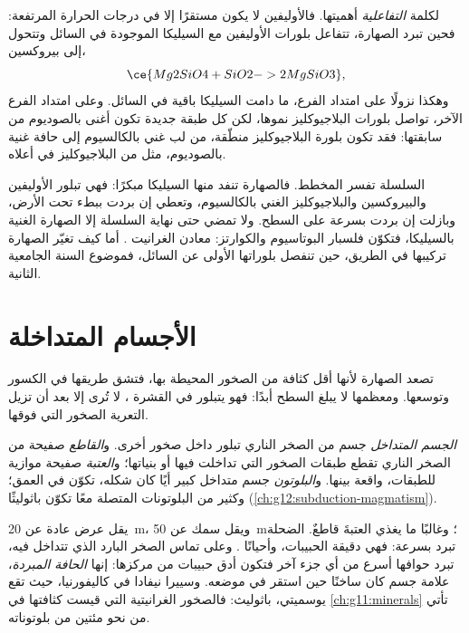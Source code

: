 لكلمة \emph{التفاعلية} أهميتها. فالأوليفين لا يكون مستقرًا إلا في درجات الحرارة المرتفعة:
فحين تبرد الصهارة، تتفاعل بلورات الأوليفين مع السيليكا الموجودة في السائل
وتتحول إلى بيروكسين،
\[
  \ce{Mg2SiO4 + SiO2 -> 2 MgSiO3},
\]
وهكذا نزولًا على امتداد الفرع، ما دامت السيليكا باقية في السائل. وعلى امتداد
الفرع الآخر، تواصل بلورات البلاجيوكليز نموها، لكن كل طبقة جديدة تكون
أغنى بالصوديوم من سابقتها: فقد تكون بلورة البلاجيوكليز منطّقة، من
لب غني بالكالسيوم إلى حافة غنية بالصوديوم، مثل  من البلاجيوكليز في
 أعلاه.

السلسلة تفسر المخطط. فالصهارة  تنفد منها السيليكا مبكرًا: فهي
تبلور الأوليفين والبيروكسين والبلاجيوكليز الغني بالكالسيوم، وتعطي
 إن بردت ببطء تحت الأرض، وبازلت إن بردت بسرعة على
السطح. ولا تمضي حتى نهاية السلسلة إلا الصهارة الغنية بالسيليكا،
فتكوّن فلسبار البوتاسيوم والكوارتز: معادن الغرانيت .
أما كيف تغيّر الصهارة تركيبها في الطريق، حين تنفصل بلوراتها الأولى
عن السائل، فموضوع السنة الجامعية الثانية.

\section{الأجسام المتداخلة}

تصعد الصهارة لأنها أقل كثافة من الصخور المحيطة بها، فتشق
طريقها في الكسور وتوسعها. ومعظمها لا يبلغ السطح أبدًا:
فهو يتبلور في القشرة ، لا تُرى إلا بعد أن
تزيل التعرية الصخور التي فوقها.

\begin{definition}\label{def:g11:igneous-rocks:intrusion}
\emph{الجسم المتداخل} جسم من الصخر الناري
تبلور داخل صخور أخرى. و\emph{القاطع} صفيحة من
الصخر الناري تقطع طبقات الصخور التي تداخلت فيها أو
بنياتها؛ و\emph{العتبة} صفيحة موازية
للطبقات، واقعة بينها. و\emph{البلوتون} جسم متداخل كبير
أيًا كان شكله، تكوّن في العمق؛ وكثير من البلوتونات المتصلة معًا تكوّن
باثوليثًا (\cref{ch:g12:subduction-magmatism}).
\end{definition}

يقل عرض  عادة عن \qty{20}{m}، ويقل سمك  عن \qty{50}{m}؛
وغالبًا ما يغذي العتبةَ قاطعٌ.   الضحلة تبرد بسرعة:
فهي دقيقة الحبيبات، وأحيانًا . وعلى تماس الصخر البارد الذي
تتداخل فيه، تبرد حوافها أسرع من أي جزء آخر فتكون أدق حبيبات من
مركزها: إنها \emph{الحافة المبردة}، علامة جسم كان ساخنًا حين
استقر في موضعه. وسييرا نيفادا في كاليفورنيا، حيث تقع يوسميتي،
باثوليث: فالصخور الغرانيتية التي قيست كثافتها في
\cref{ch:g11:minerals} تأتي من نحو مئتين من بلوتوناته.

